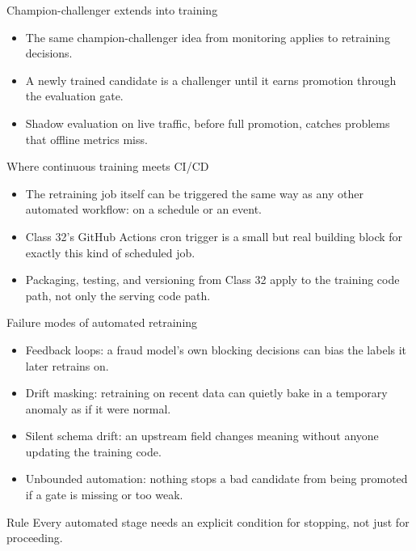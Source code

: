 \begin{frame}{Champion-challenger extends into training}
\begin{itemize}
\item The same champion-challenger idea from monitoring applies to retraining decisions.
\item A newly trained candidate is a challenger until it earns promotion through the evaluation gate.
\item Shadow evaluation on live traffic, before full promotion, catches problems that offline metrics miss.
\end{itemize}
\coursefooter
\end{frame}

\begin{frame}{Where continuous training meets CI/CD}
\begin{itemize}
\item The retraining job itself can be triggered the same way as any other automated workflow: on a schedule or an event.
\item Class 32's GitHub Actions cron trigger is a small but real building block for exactly this kind of scheduled job.
\item Packaging, testing, and versioning from Class 32 apply to the training code path, not only the serving code path.
\end{itemize}
\coursefooter
\end{frame}

\begin{frame}{Failure modes of automated retraining}
\begin{itemize}
\item Feedback loops: a fraud model's own blocking decisions can bias the labels it later retrains on.
\item Drift masking: retraining on recent data can quietly bake in a temporary anomaly as if it were normal.
\item Silent schema drift: an upstream field changes meaning without anyone updating the training code.
\item Unbounded automation: nothing stops a bad candidate from being promoted if a gate is missing or too weak.
\end{itemize}
\begin{block}{Rule}
Every automated stage needs an explicit condition for stopping, not just for proceeding.
\end{block}
\coursefooter
\end{frame}

